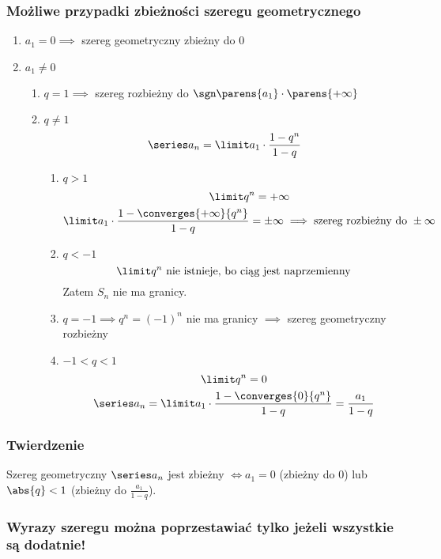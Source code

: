 \subsubsection*{Możliwe przypadki zbieżności szeregu geometrycznego}
\begin{enumerate}[label*=\arabic*.]
    \item \(a_1 = 0 \implies\) szereg geometryczny zbieżny do \(0\)
    \item \(a_1 \neq 0\)
        \begin{enumerate}[label*=\arabic*.]
            \item \(q = 1 \implies\) szereg rozbieżny do \(\sgn\parens{a_1}\cdot\parens{+\infty}\)
            \item \(q \neq 1\)
                \begin{equation*}
                    \series a_n = \limit a_1\cdot\frac{1-q^n}{1-q}
                \end{equation*}
                \begin{enumerate}[label*=\arabic*]
                    \item \(q > 1\)
                        \begin{gather*}
                            \limit q^n = +\infty\\
                            \limit a_1\cdot\frac{1-\converges{+\infty}{q^n}}{1-q} = \pm\infty \implies \textrm{szereg rozbieżny do } \pm\infty
                        \end{gather*}
                    \item \(q < -1\)
                        \begin{equation*}
                            \limit q^n\textrm{ nie istnieje, bo ciąg jest naprzemienny}
                        \end{equation*}
                        Zatem \(S_n\) nie ma granicy.
                    \item \(q = -1 \implies q^n = (-1)^n\) nie ma granicy \(\implies\) szereg geometryczny rozbieżny
                    \item \(-1 < q < 1\)
                        \begin{gather*}
                            \limit q^n = 0\\
                            \series a_n = \limit a_1\cdot\frac{1-\converges{0}{q^n}}{1-q} = \frac{a_1}{1-q}
                        \end{gather*}
                \end{enumerate}
        \end{enumerate}
\end{enumerate}
\subsubsection*{Twierdzenie}
Szereg geometryczny \(\series a_n\) jest zbieżny \(\iff a_1 = 0\) (zbieżny do \(0\)) lub \(\abs{q} < 1\) (zbieżny do \(\frac{a_1}{1-q}\)).
\subsubsection*{Wyrazy szeregu można poprzestawiać tylko jeżeli wszystkie są dodatnie!}